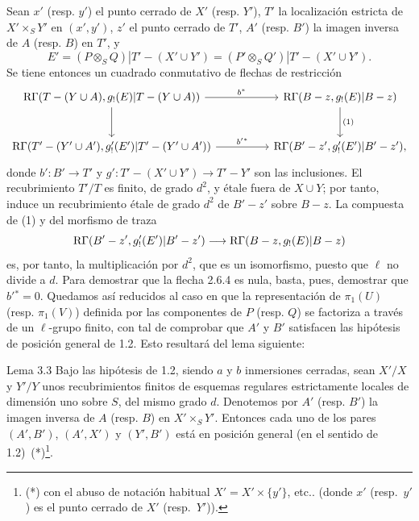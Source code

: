 Sean $x'$ (resp. $y'$) el punto cerrado de $X'$ (resp. $Y'$), $T'$ la localización estricta de $X'\times_S Y'$ en $(x',y')$, $z'$ el punto cerrado de $T'$, $A'$ (resp. $B'$) la imagen inversa de $A$ (resp. $B$) en $T'$, y
\[
E'=(P\otimes_S Q)|T'-(X'\cup Y')
   =(P'\otimes_S Q')|T'-(X'\cup Y').
\]
Se tiene entonces un cuadrado conmutativo de flechas de restricción
\[
\begin{tikzcd}[column sep=huge,row sep=large]
\R\Gamma(T-(Y\cup A),g_!(E)|T-(Y\cup A))
 \arrow[r,"b^*"] \arrow[d]
&
\R\Gamma(B-z,g_!(E)|B-z) \arrow[d,"(1)"]\\
\R\Gamma(T'-(Y'\cup A'),g'_!(E')|T'-(Y'\cup A'))
 \arrow[r,"b'{}^*"]
&
\R\Gamma(B'-z',g'_!(E')|B'-z') ,
\end{tikzcd}
\]
donde $b':B'\to T'$ y $g':T'-(X'\cup Y')\to T'-Y'$ son las inclusiones. El recubrimiento $T'/T$ es finito, de grado $d^2$, y étale fuera de $X\cup Y$; por tanto, induce un recubrimiento étale de grado $d^2$ de $B'-z'$ sobre $B-z$. La compuesta de (1) y del morfismo de traza
\[
\mathrm{R}\Gamma(B'-z',g'_!(E')|B'-z')
 \longrightarrow
\mathrm{R}\Gamma(B-z,g_!(E)|B-z)
\]
es, por tanto, la multiplicación por $d^2$, que es un isomorfismo, puesto que $\ell$ no divide a $d$. Para demostrar que la flecha 2.6.4 es nula, basta, pues, demostrar que $b'{}^*=0$. Quedamos así reducidos al caso en que la representación de $\pi_1(U)$ (resp. $\pi_1(V)$) definida por las componentes de $P$ (resp. $Q$) se factoriza a través de un $\ell$-grupo finito, con tal de comprobar que $A'$ y $B'$ satisfacen las hipótesis de posición general de 1.2. Esto resultará del lema siguiente:

\begin{statement}{Lema 3.3}
Bajo las hipótesis de 1.2, siendo $a$ y $b$ inmersiones cerradas, sean $X'/X$ y $Y'/Y$ unos recubrimientos finitos de esquemas regulares estrictamente locales de dimensión uno sobre $S$, del mismo grado $d$. Denotemos por $A'$ (resp. $B'$) la imagen inversa de $A$ (resp. $B$) en $X'\times_S Y'$. Entonces cada uno de los pares $(A',B')$, $(A',X')$ y $(Y',B')$ está en posición general (en el sentido de 1.2)~(*)\footnote{(*) con el abuso de notación habitual $X'=X'\times\{y'\}$, etc.. (donde $x'$ (resp.\ $y'$) es el punto cerrado de $X'$ (resp.\ $Y'$)).}.
\end{statement}
